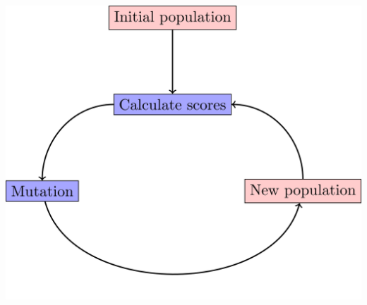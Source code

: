 \documentclass{beamer}
\newcommand{\researchfolder}{$HOME/rsc/axelrod-moran}
\newcommand{\mlresearchfolder}{$HOME/rsc/ml-paper}
\begin{document}
\begin{frame}
    \begin{center}
    \scalebox{.7}{
        
    }
    \end{center}
\end{frame}

\begin{frame}
    \begin{center}
    \scalebox{.7}{
        
    }
    \end{center}
\end{frame}

\begin{frame}
    \begin{center}
        \includegraphics[width=.8\textwidth]{../2017-02-23-Rock-Paper-Scissors-Lizard-Spock-With-Python/static/genetic_algorithm.png}
    \end{center}
\end{frame}

\begin{frame}
    \begin{center}
        \scalebox{.7}{
            
        }
    \end{center}
\end{frame}
\end{document}

